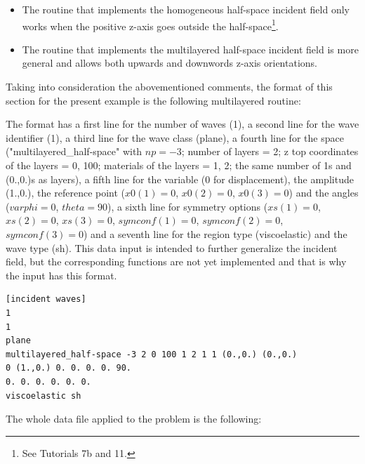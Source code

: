 \documentclass[a4]{article}
\begin{document}
\begin{itemize}
	\item The routine that implements the homogeneous half-space incident field only works when the positive z-axis goes outside the half-space\footnote{See Tutorials 7b and 11.}.
	
	\item The routine that implements the multilayered half-space incident field is more general and allows both upwards and downwords z-axis orientations.
\end{itemize}

Taking into consideration the abovementioned comments, the format of this section for the present example is the following multilayered routine:

The format has a first line for the number of waves (1), a second line for the wave identifier (1), a third line for the wave class (plane), a fourth line for the space ("multilayered\_half-space" with $np = -3$; number of layers = 2; z top coordinates of the layers = 0, 100; materials of the layers = 1, 2; the same number of 1s and (0.,0.)s as layers), a fifth line for the variable (0 for displacement), the amplitude (1.,0.), the reference point ($ x0(1) = 0 $, $ x0(2) = 0 $, $ x0(3) = 0 $)  and the angles ($ varphi = 0 $, $ theta = 90 $), a sixth line for symmetry options ($ xs(1) = 0 $, $ xs(2) = 0 $, $ xs(3) = 0 $, $ symconf(1) = 0 $, $ symconf(2) = 0 $, $ symconf(3) = 0 $) and a seventh line for the region type (viscoelastic) and the wave type (sh). This data input is intended to further generalize the incident field, but the corresponding functions are not yet implemented and that is why the input has this format. 

\begin{Verbatim}
[incident waves]
1
1
plane
multilayered_half-space -3 2 0 100 1 2 1 1 (0.,0.) (0.,0.)
0 (1.,0.) 0. 0. 0. 0. 90.
0. 0. 0. 0. 0. 0.
viscoelastic sh
\end{Verbatim}

The whole data file applied to the problem is the following:
\end{document}
